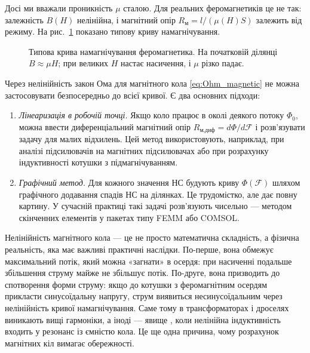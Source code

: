 \documentclass[]{ConspectBook}
\begin{document}
Досі ми вважали проникність $\mu$ сталою. Для реальних феромагнетиків це не так: залежність $B(H)$ нелінійна, і магнітний опір $R_{\text{м}} = l/(\mu(H) S)$ залежить від режиму. На рис.~\ref{tikz:magnetization_curve} показано типову криву намагнічування.

\begin{figure}[h!]
	\centering
	\caption{Типова крива намагнічування феромагнетика. На початковій ділянці $B \approx \mu H$; при великих $H$ настає насичення, і $\mu$ різко падає.}
	\label{tikz:magnetization_curve}
\end{figure}

Через нелінійність закон Ома для магнітного кола \eqref{eq:Ohm_magnetic} не можна застосовувати безпосередньо до всієї кривої. Є два основних підходи:

\begin{enumerate}
	\item \emph{Лінеаризація в робочій точці.} Якщо коло працює в околі деякого потоку $\Phi_0$, можна ввести диференціальний магнітний опір $R_{\text{м,диф}} = d\Phi/d\mathcal{F}$ і розв'язувати задачу для малих відхилень. Цей метод використовують, наприклад, при аналізі підсилювачів на магнітних підсилювачах або при розрахунку індуктивності котушки з підмагнічуванням.
	\item \emph{Графічний метод.} Для кожного значення НС будують криву $\Phi(\mathcal{F})$ шляхом графічного додавання спадів НС на ділянках. Це трудомістко, але дає повну картину. У сучасній практиці такі задачі розв'язують чисельно --- методом скінченних елементів у пакетах типу FEMM або COMSOL.
\end{enumerate}

\begin{Attention}
	Нелінійність магнітного кола --- це не просто математична складність, а фізична реальність, яка має важливі практичні наслідки. По-перше, вона обмежує максимальний потік, який можна «загнати» в осердя: при насиченні подальше збільшення струму майже не збільшує потік. По-друге, вона призводить до спотворення форми струму: якщо до котушки з феромагнітним осердям прикласти синусоїдальну напругу, струм виявиться несинусоїдальним через нелінійність кривої намагнічування. Саме тому в трансформаторах і дроселях виникають вищі гармоніки, а іноді --- явище , коли нелінійна індуктивність входить у резонанс із ємністю кола. Це ще одна причина, чому розрахунок магнітних кіл вимагає обережності.
\end{Attention}
\end{document}
